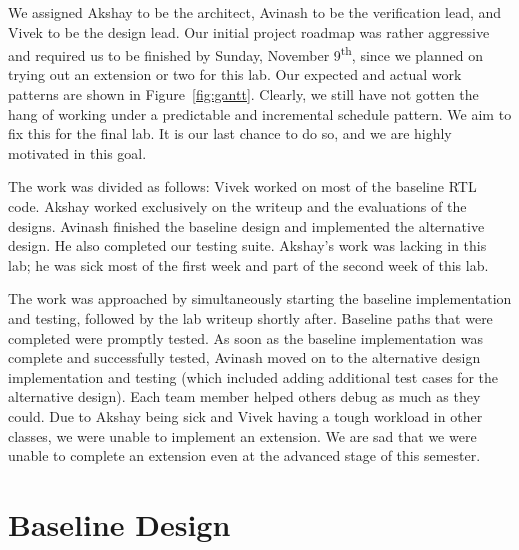 \documentclass[10pt]{article}
\begin{document}
We assigned Akshay to be the architect,
Avinash to be the verification lead,
and Vivek to be the design lead.
Our initial project roadmap was rather aggressive and required us to be 
finished by Sunday, November 9\textsuperscript{th}, since we planned on 
trying out an extension or two for this lab. 
Our expected and actual work patterns are shown in Figure~\ref{fig:gantt}.
Clearly, we still have not gotten the hang of working under a predictable
and incremental schedule pattern.
We aim to fix this for the final lab.
It is our last chance to do so, and we are highly motivated in this goal.
 \par

The work was divided as follows:
Vivek worked on most of the baseline RTL code.
Akshay worked exclusively on the writeup and the evaluations of the designs.
Avinash finished the baseline design and implemented the alternative design.
He also completed our testing suite.
Akshay's work was lacking in this lab; he was sick most of the first week
and part of the second week of this lab. \par

The work was approached by simultaneously starting the baseline 
implementation and testing, followed by the lab writeup shortly after.
Baseline paths that were completed were promptly tested. 
As soon as the baseline implementation was complete and successfully tested, 
Avinash moved on to the alternative design implementation and testing 
(which included adding additional test cases for the alternative design). 
Each team member helped others debug as much as they could. 
Due to Akshay being sick and Vivek having a tough workload in other classes,
we were unable to implement an extension. 
We are sad that we were unable to complete an extension even at the advanced
stage of this semester. 


\section{Baseline Design}
\end{document}
